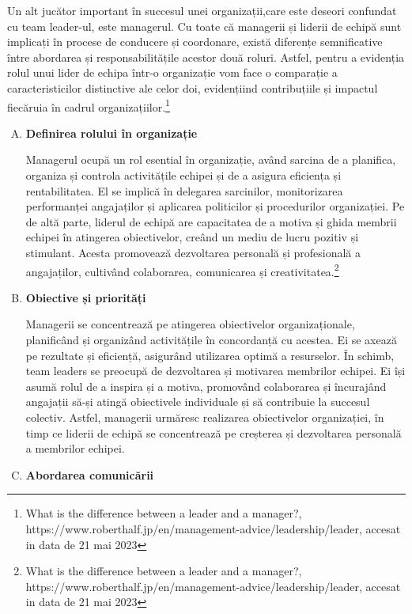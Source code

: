 \documentclass[a4paper, 12pt]{article}
\begin{document}
	\quad\quad Un alt jucător important în succesul unei organizații,care este deseori confundat cu team leader-ul, este managerul. Cu toate că managerii și liderii de echipă sunt implicați în procese de conducere și coordonare, există diferențe semnificative între abordarea și responsabilitățile acestor două roluri. Astfel, pentru a evidenția rolul unui lider de echipa într-o organizație vom face o comparație a caracteristicilor distinctive ale celor doi, evidențiind contribuțiile și impactul fiecăruia în cadrul organizațiilor.\footnote{What is the difference between a leader and a manager?, https://www.roberthalf.jp/en/management-advice/leadership/leader, accesat in data de 21 mai 2023}
\newpage

	\begin{enumerate}[A)]

		\item\textbf{Definirea rolului în organizație}
		
		\quad Managerul ocupă un rol esential în organizație, având sarcina de a planifica, organiza și controla activitățile echipei și de a asigura eficiența și rentabilitatea. El se implică în delegarea sarcinilor, monitorizarea performanței angajaților și aplicarea politicilor și procedurilor organizației. Pe de altă parte, liderul de echipă are capacitatea de a motiva și ghida membrii echipei în atingerea obiectivelor, creând un mediu de lucru pozitiv și stimulant. Acesta promovează dezvoltarea personală și profesională a angajaților, cultivând colaborarea, comunicarea și creativitatea.\footnote{What is the difference between a leader and a manager?, https://www.roberthalf.jp/en/management-advice/leadership/leader, accesat in data de 21 mai 2023}

		\item \textbf{Obiective și priorități}

		\quad\quad Managerii se concentrează pe atingerea obiectivelor organizaționale, planificând și organizând activitățile în concordanță cu acestea. Ei se axează pe rezultate și eficiență, asigurând utilizarea optimă a resurselor. În schimb, team leaders se preocupă de dezvoltarea și motivarea membrilor echipei. Ei își asumă rolul de a inspira și a motiva, promovând colaborarea și încurajând angajații să-și atingă obiectivele individuale și să contribuie la succesul colectiv. Astfel, managerii urmăresc realizarea obiectivelor organizației, în timp ce liderii de echipă se concentrează pe creșterea și dezvoltarea personală a membrilor echipei.

		\item \textbf{Abordarea comunicării}
		

\end{enumerate}
\end{document}
